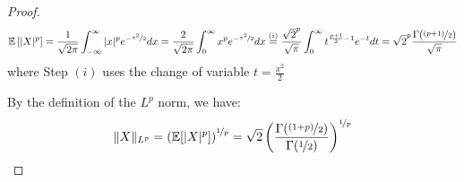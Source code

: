 \documentclass{article}
\theoremstyle{remark}
\newcommand{\Exp}{\mathbb{E}}
\begin{document}
\begin{proof}
\begin{equation*}
\Exp\left[|X|^{p}\right] = \frac{1}{\sqrt{2\pi}}\int_{-\infty}^{\infty} |x|^{p}e^{-\nicefrac{x^{2}}{2}} dx = \frac{2}{\sqrt{2\pi}}\int_{0}^{\infty} x^{p}e^{-\nicefrac{x^{2}}{2}} dx \overset{(i)}= \frac{\sqrt{2}^{p}}{\sqrt{\pi}}\int_{0}^{\infty} t^{\frac{p+1}{2} - 1} e^{-t} dt = \sqrt{2}^{p}\frac{\Gamma(\nicefrac{(p + 1)}{2})}{\sqrt{\pi}}
\end{equation*}
where Step \((i)\) uses the change of variable \(t = \frac{x^{2}}{2}\)

By the definition of the \(L^{p}\) norm, we have:
\begin{equation*}
\|X\|_{L^{p}} = \left(\Exp[|X|^{p}]\right)^{\nicefrac{1}{p}} = \sqrt{2}\left(\frac{\Gamma(\nicefrac{(1 + p)}{2})}{\Gamma(\nicefrac{1}{2})}\right)^{\nicefrac{1}{p}}
\end{equation*}
\end{proof}
\end{document}
